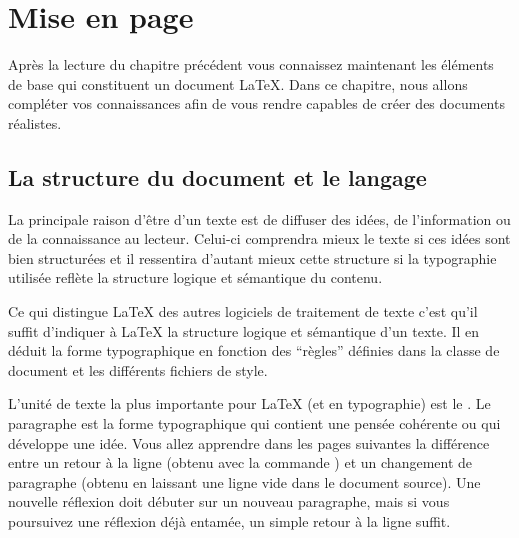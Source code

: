 

\chapter{Mise en page}
\thispagestyle{plain}

\begin{intro}
  Après la lecture du chapitre précédent vous connaissez maintenant
  les éléments de base qui constituent un document \LaTeX{}. Dans ce
  chapitre, nous allons compléter vos connaissances afin de vous
  rendre capables de créer des documents réalistes.
\end{intro}

\section{La structure du document et le langage}

La principale raison d'être d'un texte est de diffuser des idées, de
l'information ou de la connaissance au lecteur. Celui-ci comprendra
mieux le texte si ces idées sont bien structurées et il
ressentira d'autant mieux cette structure si la typographie utilisée
reflète la structure logique et sémantique du contenu.

Ce qui distingue \LaTeX{} des autres logiciels de traitement de texte
c'est qu'il suffit d'indiquer à \LaTeX{} la structure logique et
sémantique d'un texte. Il en déduit la forme typographique en fonction
des \enquote{règles} définies dans la classe de document et les différents
fichiers de style.

L'unité de texte la plus importante pour \LaTeX{} (et en typographie)
est le .  Le paragraphe est la forme typographique qui
contient une pensée cohérente ou qui développe une idée. Vous allez
apprendre dans les pages suivantes la différence entre un retour à la
ligne (obtenu avec la commande \texttt{\bs\bs}) et un changement de
paragraphe (obtenu en laissant une ligne vide dans le document
source). Une nouvelle réflexion doit débuter sur un nouveau
paragraphe, mais si vous poursuivez une réflexion déjà entamée, un
simple retour à la ligne suffit.

